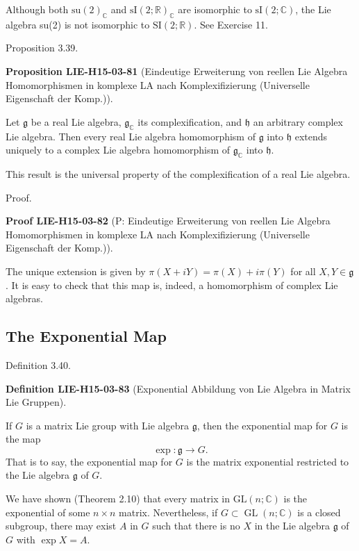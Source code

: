 \documentclass[10pt, letterpaper]{article}
\newcommand{\CustomHeading}[3]{%
  \par\medskip\noindent%
  \textbf{#1 #2} \textnormal{(#3)}.\enskip%
}
\newenvironment{DEF}[2]{\begin{unitbox}\CustomHeading{Definition}{#1}{#2}}{\end{unitbox}}
\newenvironment{PROP}[2]{\begin{unitbox}\CustomHeading{Proposition}{#1}{#2}}{\end{unitbox}}
\newenvironment{PROOF}[2]{\begin{unitbox}\CustomHeading{Proof}{#1}{#2}}{\end{unitbox}}
\begin{document}
Although both $\mathrm{su}(2)_{\mathbb{C}}$ and $\mathrm{sI}(2 ; \mathbb{R})_{\mathbb{C}}$ are isomorphic to $\mathrm{sI}(2 ; \mathbb{C})$, the Lie algebra su(2) is not isomorphic to $\mathrm{SI}(2 ; \mathbb{R})$. See Exercise 11.

Proposition 3.39. 

\begin{PROP}{LIE-H15-03-81}{Eindeutige Erweiterung von reellen Lie Algebra Homomorphismen in komplexe LA nach Komplexifizierung (Universelle Eigenschaft der Komp.)}
Let $\mathfrak{g}$ be a real Lie algebra, $\mathfrak{g}_{\mathbb{C}}$ its complexification, and $\mathfrak{h}$ an arbitrary complex Lie algebra. Then every real Lie algebra homomorphism of $\mathfrak{g}$ into $\mathfrak{h}$ extends uniquely to a complex Lie algebra homomorphism of $\mathfrak{g}_{\mathbb{C}}$ into $\mathfrak{h}$.
\end{PROP}

This result is the universal property of the complexification of a real Lie algebra.

Proof. 

\begin{PROOF}{LIE-H15-03-82}{P: Eindeutige Erweiterung von reellen Lie Algebra Homomorphismen in komplexe LA nach Komplexifizierung (Universelle Eigenschaft der Komp.)}
The unique extension is given by $\pi(X+i Y)=\pi(X)+i \pi(Y)$ for all $X, Y \in \mathfrak{g}$. It is easy to check that this map is, indeed, a homomorphism of complex Lie algebras.
\end{PROOF}



\subsection*{The Exponential Map}
Definition 3.40. 


\begin{DEF}{LIE-H15-03-83}{Exponential Abbildung von Lie Algebra in Matrix Lie Gruppen}
If $G$ is a matrix Lie group with Lie algebra $\mathfrak{g}$, then the exponential map for $G$ is the map
$$
\exp : \mathfrak{g} \rightarrow G .
$$
That is to say, the exponential map for $G$ is the matrix exponential restricted to the Lie algebra $\mathfrak{g}$ of $G$. 

We have shown (Theorem 2.10) that every matrix in $\mathrm{GL}(n ; \mathbb{C})$ is the exponential of some $n \times n$ matrix. Nevertheless, if $G \subset \operatorname{GL}(n ; \mathbb{C})$ is a closed subgroup, there may exist $A$ in $G$ such that there is no $X$ in the Lie algebra $\mathfrak{g}$ of $G$ with $\exp X=A$.
\end{DEF}
\end{document}
